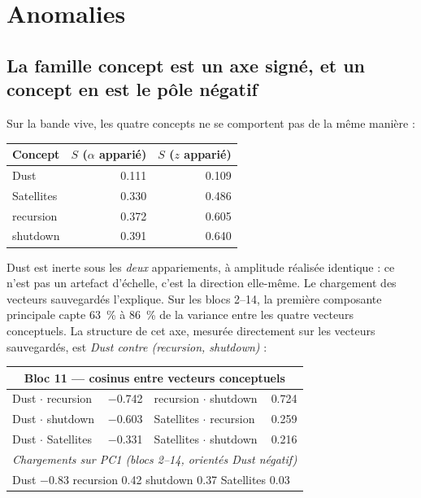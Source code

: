 \documentclass[11pt,a4paper]{article}
\begin{document}
\section{Anomalies}

\subsection{La famille \og concept \fg{} est un axe signé, et un concept en est le pôle négatif}

Sur la bande vive, les quatre concepts ne se comportent pas de la même manière :

\begin{center}
\begin{tabular}{lrr}
\toprule
Concept & $S$ ($\alpha$ apparié) & $S$ ($z$ apparié) \\
\midrule
Dust        & \num{0.111} & \num{0.109} \\
Satellites  & \num{0.330} & \num{0.486} \\
recursion   & \num{0.372} & \num{0.605} \\
shutdown    & \num{0.391} & \num{0.640} \\
\bottomrule
\end{tabular}
\end{center}

\noindent
Dust est inerte sous les \emph{deux} appariements, à amplitude réalisée identique : ce
n'est pas un artefact d'échelle, c'est la direction elle-même. Le chargement des vecteurs
sauvegardés l'explique. Sur les blocs 2--14, la première composante principale capte
\SI{63}{\percent} à \SI{86}{\percent} de la variance entre les quatre vecteurs
conceptuels. La structure de cet axe, mesurée directement sur les vecteurs
sauvegardés, est \emph{Dust contre (recursion, shutdown)} :

\begin{center}
\begin{tabular}{lr@{\qquad}lr}
\multicolumn{4}{c}{\textbf{Bloc 11 --- cosinus entre vecteurs conceptuels}} \\
\toprule
Dust $\cdot$ recursion  & \num{-0.742} & recursion $\cdot$ shutdown   & \num{+0.724} \\
Dust $\cdot$ shutdown   & \num{-0.603} & Satellites $\cdot$ recursion & \num{+0.259} \\
Dust $\cdot$ Satellites & \num{-0.331} & Satellites $\cdot$ shutdown  & \num{+0.216} \\
\midrule
\multicolumn{4}{l}{\emph{Chargements sur PC1 (blocs 2--14, orientés Dust négatif)}} \\
\multicolumn{4}{l}{\quad Dust \num{-0.83} \quad recursion \num{+0.42} \quad
 shutdown \num{+0.37} \quad Satellites \num{+0.03}} \\
\bottomrule
\end{tabular}
\end{center}
\end{document}
